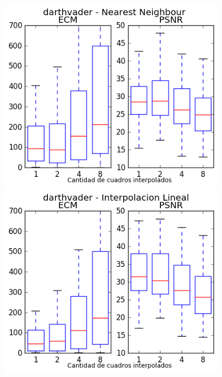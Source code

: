 \begin{figure}[H]
\centering
\begin{minipage}{0.35\textwidth}
    \includegraphics[width=1\textwidth]{imgs/resultados_error/darthvader_0.png}
\end{minipage}%
\begin{minipage}{0.35\textwidth}   
    \includegraphics[width=1\textwidth]{imgs/resultados_error/darthvader_1.png} 
\end{minipage}
\end{figure}
